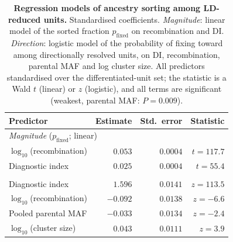\begin{table}[!ht]
\centering
\caption{\textbf{Regression models of ancestry sorting among LD-reduced units.}
Standardised coefficients. \emph{Magnitude}: linear model of the sorted fraction
$p_{\mathrm{fixed}}$ on recombination and DI. \emph{Direction}: logistic model of
the probability of fixing toward \Faq{} among directionally resolved units, on DI,
recombination, parental MAF and log cluster size. All predictors standardised over
the differentiated-unit set; the statistic is a Wald $t$ (linear) or $z$ (logistic),
and all terms are significant (weakest, parental MAF: $P=0.009$).}
\label{tab:architecture-models}
\begin{tabular}{lrrr}
\toprule
Predictor & Estimate & Std.\ error & Statistic \\
\midrule
\multicolumn{4}{l}{\emph{Magnitude} ($p_{\mathrm{fixed}}$; linear)} \\
\quad $\log_{10}$(recombination) & $0.053$ & $0.0004$ & $t=117.7$ \\
\quad Diagnostic index & $0.025$ & $0.0004$ & $t=55.4$ \\
\addlinespace
\multicolumn{4}{l}{\emph{Direction} ($P(\text{fix}\rightarrow\Faq)$; logistic)} \\
\quad Diagnostic index & $1.596$ & $0.0141$ & $z=113.5$ \\
\quad $\log_{10}$(recombination) & $-0.092$ & $0.0138$ & $z=-6.6$ \\
\quad Pooled parental MAF & $-0.033$ & $0.0134$ & $z=-2.4$ \\
\quad $\log_{10}$(cluster size) & $0.043$ & $0.0111$ & $z=3.9$ \\
\bottomrule
\end{tabular}
\end{table}
